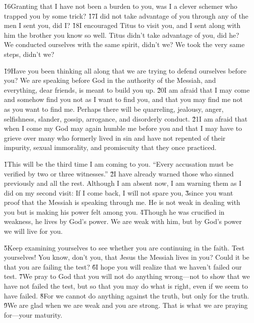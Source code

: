 \v{16}Granting that I have not been a burden to you, was I a clever schemer who trapped you by some trick? \v{17}I did not take advantage of you through any of the men I sent you, did I? \v{18}I encouraged Titus to visit you, and I sent along with him the brother you know so well. Titus didn't take advantage of you, did he? We conducted ourselves with the same spirit, didn't we? We took the very same steps, didn't we?

\v{19}Have you been thinking all along that we are trying to defend ourselves before you? We are speaking before God in the authority of the Messiah, and everything, dear friends, is meant to build you up. \v{20}I am afraid that I may come and somehow find you not as I want to find you, and that you may find me not as you want to find me. Perhaps there will be quarreling, jealousy, anger, selfishness, slander, gossip, arrogance, and disorderly conduct. \v{21}I am afraid that when I come my God may again humble me before you and that I may have to grieve over many who formerly lived in sin and have not repented of their impurity, sexual immorality, and promiscuity that they once practiced.

\v{1}This will be the third time I am coming to you. ``Every accusation must be verified by two or three witnesses.'' \v{2}I have already warned those who sinned previously and all the rest. Although I am absent now, I am warning them as I did on my second visit: If I come back, I will not spare you, \v{3}since you want proof that the Messiah is speaking through me. He is not weak in dealing with you but is making his power felt among you. \v{4}Though he was crucified in weakness, he lives by God's power. We are weak with him, but by God's power we will live for you.

\v{5}Keep examining yourselves to see whether you are continuing in the faith. Test yourselves! You know, don't you, that Jesus the Messiah lives in you? Could it be that you are failing the test? \v{6}I hope you will realize that we haven't failed our test. \v{7}We pray to God that you will not do anything wrong---not to show that we have not failed the test, but so that you may do what is right, even if we seem to have failed. \v{8}For we cannot do anything against the truth, but only for the truth. \v{9}We are glad when we are weak and you are strong. That is what we are praying for---your maturity.

